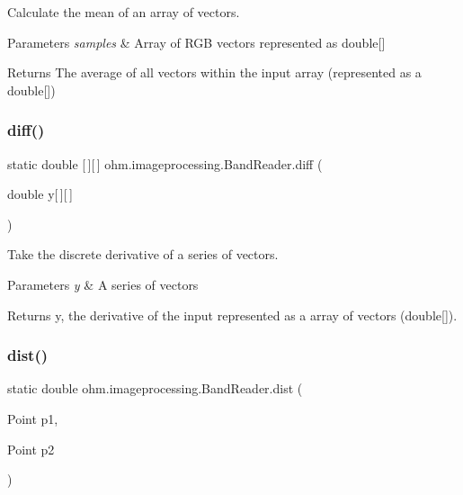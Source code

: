Calculate the mean of an array of vectors. 
\begin{DoxyParams}{Parameters}
{\em samples} & Array of R\+GB vectors represented as double\mbox{[}\mbox{]} \\
\hline
\end{DoxyParams}
\begin{DoxyReturn}{Returns}
The average of all vectors within the input array (represented as a double\mbox{[}\mbox{]}) 
\end{DoxyReturn}
\hypertarget{classohm_1_1imageprocessing_1_1_band_reader_a1482e17c3db23f374ec320d363fffac1}{}\label{classohm_1_1imageprocessing_1_1_band_reader_a1482e17c3db23f374ec320d363fffac1} 
\subsubsection{\texorpdfstring{diff()}{diff()}}
{\footnotesize\ttfamily static double \mbox{[}$\,$\mbox{]}\mbox{[}$\,$\mbox{]} ohm.\+imageprocessing.\+Band\+Reader.\+diff (\begin{DoxyParamCaption}\item[{double}]{y\mbox{[}$\,$\mbox{]}\mbox{[}$\,$\mbox{]} }\end{DoxyParamCaption})\hspace{0.3cm}{\ttfamily [static]}}

Take the discrete derivative of a series of vectors. 
\begin{DoxyParams}{Parameters}
{\em y} & A series of vectors \\
\hline
\end{DoxyParams}
\begin{DoxyReturn}{Returns}
y\textquotesingle{}, the derivative of the input represented as a array of vectors (double\mbox{[}\mbox{]}). 
\end{DoxyReturn}
\hypertarget{classohm_1_1imageprocessing_1_1_band_reader_a10ab79859262742046ab3b3dda006c60}{}\label{classohm_1_1imageprocessing_1_1_band_reader_a10ab79859262742046ab3b3dda006c60} 
\subsubsection{\texorpdfstring{dist()}{dist()}}
{\footnotesize\ttfamily static double ohm.\+imageprocessing.\+Band\+Reader.\+dist (\begin{DoxyParamCaption}\item[{Point}]{p1,  }\item[{Point}]{p2 }\end{DoxyParamCaption})\hspace{0.3cm}{\ttfamily [static]}}

